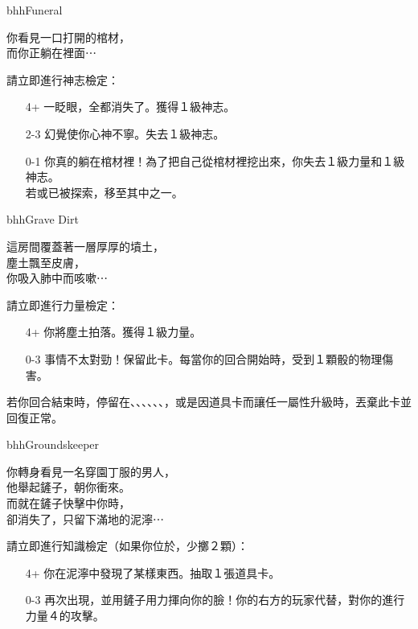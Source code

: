 \begin{EventCard}{bhh}{Funeral}
  \begin{CardStory}
    你看見一口打開的棺材，\\
    而你正躺在裡面⋯
  \end{CardStory}
  請立即進行神志檢定：
  \begin{itemize}
    \item[4+] 一眨眼，全都消失了。獲得１級神志。
    \item[2-3] 幻覺使你心神不寧。失去１級神志。
    \item[0-1] 你真的躺在棺材裡！為了把自己從棺材裡挖出來，你失去１級力量和１級神志。\\
               若或已被探索，移至其中之一。
  \end{itemize}
\end{EventCard}%
\linebreak[0]%
\begin{EventCard}{bhh}{Grave Dirt}
  \begin{CardStory}
    這房間覆蓋著一層厚厚的墳土，\\
    塵土飄至皮膚，\\
    你吸入肺中而咳嗽⋯
  \end{CardStory}
  請立即進行力量檢定：
  \begin{itemize}
    \item[4+] 你將塵土拍落。獲得１級力量。
    \item[0-3] 事情不太對勁！保留此卡。每當你的回合開始時，受到１顆骰的物理傷害。
  \end{itemize}
  若你回合結束時，停留在、、、、、、，或是因道具卡而讓任一屬性升級時，丟棄此卡並回復正常。\smallbreak
\end{EventCard}%
\linebreak[0]%
\begin{EventCard}{bhh}{Groundskeeper}
  \begin{CardStory}
    你轉身看見一名穿園丁服的男人，\\
    他舉起鏟子，朝你衝來。\\
    而就在鏟子快擊中你時，\\
    卻消失了，只留下滿地的泥濘⋯
  \end{CardStory}
  請立即進行知識檢定（如果你位於，少擲２顆）：
  \begin{itemize}
    \item[4+] 你在泥濘中發現了某樣東西。抽取１張道具卡。
    \item[0-3] \ThisName{}再次出現，並用鏟子用力揮向你的臉！你的右方的玩家代替\ThisName{}，對你的進行力量４的攻擊。
  \end{itemize}
\end{EventCard}%
